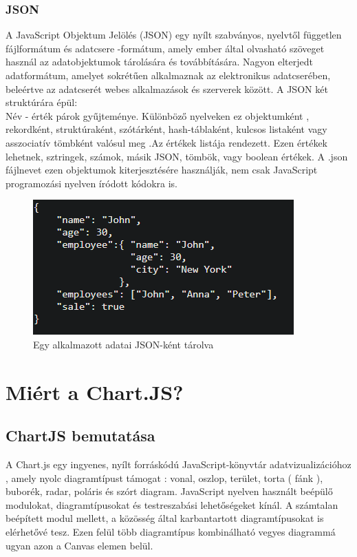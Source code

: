 \subsubsection{JSON}

A JavaScript Objektum Jelölés (JSON) egy nyílt szabványos,  nyelvtől független fájlformátum és adatcsere -formátum, amely ember által olvasható szöveget használ az adatobjektumok tárolására és továbbítására. Nagyon elterjedt adatformátum, amelyet sokrétűen alkalmaznak az elektronikus adatcserében, beleértve az adatcserét webes alkalmazások és szerverek között. A JSON két struktúrára épül: \\

Név - érték párok gyűjteménye. Különböző nyelveken ez objektumként , rekordként, struktúraként, szótárként, hash-táblaként, kulcsos listaként vagy asszociatív tömbként valósul meg .Az értékek listája rendezett. Ezen értékek lehetnek, sztringek, számok,  másik JSON, tömbök, vagy boolean értékek. A .json fájlnevet ezen objektumok kiterjesztésére használják, nem csak JavaScript programozási nyelven íródott kódokra is. \\

\begin{figure}[h]
\centering
\includegraphics[scale=0.9]{images/jsonExample.png}
\caption{Egy alkalmazott adatai JSON-ként tárolva }
\end{figure}


\section{Miért a Chart.JS? }

\subsection{ChartJS bemutatása}

A Chart.js egy ingyenes, nyílt forráskódú JavaScript-könyvtár adatvizualizációhoz , amely nyolc diagramtípust támogat : vonal, oszlop, terület, torta ( fánk ), buborék, radar, poláris és szórt diagram. JavaScript nyelven használt beépülő modulokat, diagramtípusokat és testreszabási lehetőségeket kínál. A számtalan beépített modul mellett, a közösség által karbantartott diagramtípusokat is elérhetővé tesz. Ezen felül több diagramtípus kombinálható vegyes diagrammá ugyan azon a Canvas elemen belül. \cite{ChartJS}

